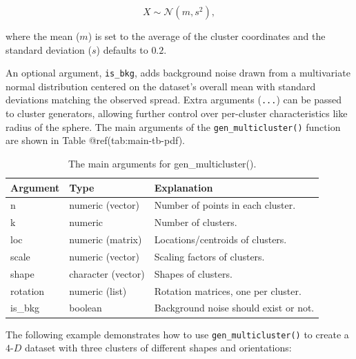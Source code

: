 \documentclass[
  11pt,
  a4paper,
]{report}
\begin{document}
\[
X \sim \mathcal{N}(m, s^2),
\]

where the mean (\(m\)) is set to the average of the cluster coordinates
and the standard deviation (\(s\)) defaults to \(0.2\).

An optional argument, \texttt{is\_bkg}, adds background noise drawn from
a multivariate normal distribution centered on the dataset's overall
mean with standard deviations matching the observed spread. Extra
arguments (\texttt{...}) can be passed to cluster generators, allowing
further control over per-cluster characteristics like radius of the
sphere. The main arguments of the \texttt{gen\_multicluster()} function
are shown in Table @ref(tab:main-tb-pdf).

\begin{table}

\caption{\label{tab:main-tb-pdf}The main arguments for gen\_multicluster().}
\centering
\begin{tabular}[t]{>{\raggedright\arraybackslash}p{2cm}>{\raggedright\arraybackslash}p{3cm}>{\raggedright\arraybackslash}p{8cm}}
\toprule
Argument & Type & Explanation\\
\midrule
n & numeric (vector) & Number of points in each cluster.\\
k & numeric & Number of clusters.\\
loc & numeric (matrix) & Locations/centroids of clusters.\\
scale & numeric (vector) & Scaling factors of clusters.\\
shape & character (vector) & Shapes of clusters.\\
rotation & numeric (list) & Rotation matrices, one per cluster.\\
is\_bkg & boolean & Background noise should exist or not.\\
\bottomrule
\end{tabular}
\end{table}

The following example demonstrates how to use
\texttt{gen\_multicluster()} to create a \(4\text{-}D\) dataset with
three clusters of different shapes and orientations:
\end{document}
